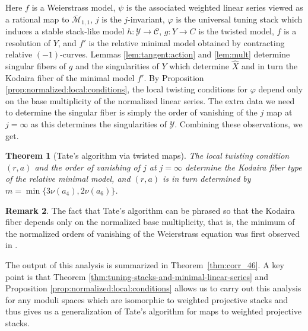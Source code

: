\documentclass[a4paper,12pt]{amsart}
\newtheorem{thm}{Theorem}[section]
\theoremstyle{definition}
\newtheorem{rmk}[thm]{Remark}
\newcommand{\cY}{\mathcal{Y}}
\newcommand{\cC}{\mathcal{C}}
\newcommand{\cM}{\mathcal{M}}
\begin{document}
	Here $f$ is a Weierstrass model, $\psi$ is the associated weighted linear series viewed as a rational map to $\overline{\cM}_{1,1}$, $j$ is the $j$-invariant, $\varphi$ is the universal tuning stack which induces a stable stack-like model $h : \cY \to \cC$, $g : Y \to C$ is the twisted model, $\hat{f}$ is a resolution of $Y$, and $f'$ is the relative minimal model obtained by contracting relative $(-1)$-curves. Lemmas \ref{lem:tangent:action} and \ref{lem:mult} determine singular fibers of $g$ and the singularities of $Y$ which determine $\hat{X}$ and in turn the Kodaira fiber of the minimal model $f'$. By Proposition \ref{prop:normalized:local:conditions}, the local twisting conditions for $\varphi$ depend only on the base multiplicity of the normalized linear series. The extra data we need to determine the singular fiber is simply the order of vanishing of the $j$ map at $j = \infty$ as this determines the singularities of $\cY$. Combining these observations, we get. 
	
	\begin{thm}[Tate's algorithm via twisted maps]\label{thm:tate} The local twisting condition $(r,a)$ and the order of vanishing of $j$ at $j = \infty$ determine the Kodaira fiber type of the relative minimal model, and $(r,a)$ is in turn determined by $m = \min\{3\nu(a_4), 2\nu(a_6)\}$. 
	\end{thm}
	
	\begin{rmk}
		The fact that Tate's algorithm can be phrased so that the Kodaira fiber depends only on the normalized base multiplicity, that is, the minimum of the normalized orders of vanishing of the Weierstrass equation was first observed in \cite{Dokchitser}.
		
	\end{rmk}
	
	The output of this analysis is summarized in Theorem~\ref{thm:corr_46}. A key point is that Theorem \ref{thm:tuning-stacks-and-minimal-linear-series} and Proposition \ref{prop:normalized:local:conditions} allows us to carry out this analysis for any moduli spaces which are isomorphic to weighted projective stacks and thus gives us a generalization of Tate's algorithm for maps to weighted projective stacks. 
	
\end{document}
